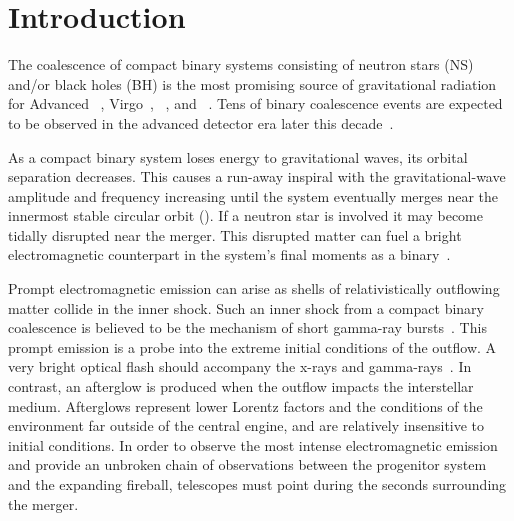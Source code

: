 \section{Introduction}
\label{sec:introduction}


The coalescence of compact binary systems consisting of neutron stars (NS)
and/or black holes (BH) is the most promising source of gravitational radiation
for Advanced \LIGO~\cite{ALIGOWeb}, Virgo~\cite{AVirgoWeb}, \GEO~\cite{GEOWeb},
and \LCGT~\cite{LCGTWeb}.  Tens of binary coalescence events are expected to be
observed in the advanced detector era later this
decade~\cite{Abadie:2010p10836}.

As a compact binary system loses energy to gravitational waves, its orbital
separation decreases. This causes a run-away inspiral with the
gravitational-wave amplitude and frequency increasing until the system
eventually merges near the innermost stable circular orbit (\ISCO).  If a
neutron star is involved it may become tidally disrupted near the merger.  This
disrupted matter can fuel a bright electromagnetic counterpart in the system's
final moments as a binary~\cite{shibata:2007}.

Prompt electromagnetic emission can arise as shells of relativistically
outflowing matter collide in the inner shock. Such an inner shock from a
compact binary coalescence is believed to be the mechanism of short gamma-ray
bursts~\cite{nakar07}. This prompt emission is a probe into the extreme initial
conditions of the outflow. A very bright optical flash should accompany the
x-rays and gamma-rays~\cite{Sari99}.  In contrast, an afterglow is
produced when the outflow impacts the interstellar medium.  Afterglows
represent lower Lorentz factors and the conditions of the environment far
outside of the central engine, and are relatively insensitive to initial
conditions. In order to observe the most intense electromagnetic emission and
provide an unbroken chain of observations between the progenitor system and the
expanding fireball, telescopes must point during the seconds surrounding the
merger.

